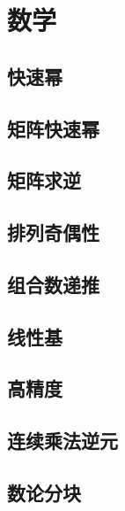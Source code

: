 \documentclass[twocolumn,a4]{article}  %
\begin{document}
	\section{数学}
		\subsection{快速幂}
	 	 	
	 	 	
		\subsection{矩阵快速幂}
	 	 	
	 	 	
		\subsection{矩阵求逆}
	 	 	
	 	 	
		\subsection{排列奇偶性}
	 	 	
	 	 	
		\subsection{组合数递推}
	 	 	

		\subsection{线性基}
	 	 	

	 	\subsection{高精度}
	 	 	
	 	 	
	 	\subsection{连续乘法逆元}
	 	 	
	
	 	\subsection{数论分块}
	 	 	
	
\end{document}

